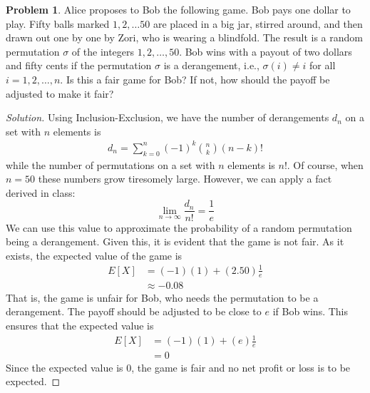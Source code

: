 \documentclass[12pt]{article}
\newcounter{chapternumber}
\theoremstyle{definition}
\newtheorem{problem-internal}{Problem}[chapternumber]
\newenvironment{problem}{
  \medskip
  \begin{problem-internal}
}{
\end{problem-internal}
}
\newenvironment{solution}{
  \begin{proof}[Solution]
    \vspace{-8px}
    \setlength{\parskip}{4px}
    \setlength{\parindent}{0px}
}{
\end{proof}
}
\begin{document}
  \begin{problem}
    Alice proposes to Bob the following game. Bob pays one dollar to play.
    Fifty balls marked \(1, 2, \ldots 50\) are placed in a big jar, stirred around, and then drawn out one by one by Zori, who is wearing a blindfold.
    The result is a random permutation \(\sigma\) of the integers \(1, 2, \ldots, 50\).
    Bob wins with a payout of two dollars and fifty cents if the permutation \(\sigma\) is a derangement, i.e., \(\sigma(i) \neq i\) for all \(i = 1, 2, \ldots, n\).
    Is this a fair game for Bob? If not, how should the payoff be adjusted to make it fair?
  \end{problem}

  \begin{solution}
    Using Inclusion-Exclusion, we have the number of derangements \(d_{n}\) on a set with \(n\) elements is
    \begin{align*}
      d_{n} = \sum_{k=0}^{n} (-1)^{k} {n \choose k} (n-k)!
    \end{align*}
    while the number of permutations on a set with \(n\) elements is \(n!\). Of course, when \(n=50\) these numbers grow tiresomely large. However, we can apply a fact derived in class:
    \begin{equation*}
      \lim_{n \to \infty} \frac{d_{n}}{n!} = \frac{1}{e}
    \end{equation*}
    We can use this value to approximate the probability of a random permutation being a derangement. Given this, it is evident that the game is not fair. As it exists, the expected value of the game is
    \begin{align*}
      E[X] &= (-1) (1) + (2.50) \frac{1}{e} \\
           &\approx -0.08
    \end{align*}
    That is, the game is unfair for Bob, who needs the permutation to be a derangement. The payoff should be adjusted to be close to \(e\) if Bob wins. This ensures that the expected value is
    \begin{align*}
      E[X] &= (-1) (1) + (e) \frac{1}{e} \\
           &= 0
    \end{align*}
    Since the expected value is 0, the game is fair and no net profit or loss is to be expected.
  \end{solution}
\end{document}
